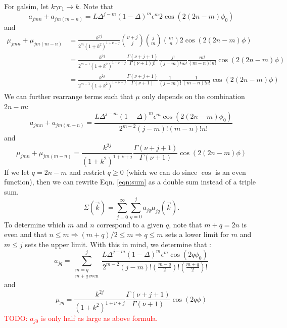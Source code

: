 \documentclass{article}
\newcommand{\red}[1]{\textcolor{red}{#1}}
\begin{document}
For galsim, let $k \gamma r_1 \rightarrow k$.
Note that
\begin{equation}
  a_{jmn} + a_{jm(m-n)} = L \Delta^{j-m}(1-\Delta)^m\epsilon^m2\cos(2 (2n-m) \phi_0)
\end{equation}
and
\begin{equation}
  \begin{split}
    \mu_{jmn} + \mu_{jm(m-n)} & = \frac{k^{2j}}{2^m(1+k^2)^{1+\nu+j}}\binom{\nu+j}{j}\binom{j}{m}\binom{m}{n}2 \cos(2 (2n-m) \phi) \\
    & = \frac{k^{2j}}{2^{m-1}(1+k^2)^{1+\nu+j}}
    \frac{\Gamma(\nu+j+1)}{\Gamma(\nu+1) j!}
    \frac{j!}{(j-m)!m!}
    \frac{m!}{(m-n)!n!}
    \cos(2 (2n-m) \phi) \\
    & = \frac{k^{2j}}{2^{m-1}(1+k^2)^{1+\nu+j}}
    \frac{\Gamma(\nu+j+1)}{\Gamma(\nu+1)}
    \frac{1}{(j-m)!}
    \frac{1}{(m-n)!n!}
    \cos(2 (2n-m) \phi)
  \end{split}
\end{equation}
We can further rearrange terms such that $\mu$ only depends on the combination $2n-m$:
\begin{equation}
  a_{jmn} + a_{jm(m-n)} = \frac{L \Delta^{j-m}(1-\Delta)^m\epsilon^m\cos(2 (2n-m) \phi_0)}
  {2^{m-2}(j-m)!(m-n)!n!}
\end{equation}
and
\begin{equation}
  \mu_{jmn} + \mu_{jm(m-n)} = \frac{k^{2j}}{(1+k^2)^{1+\nu+j}}
    \frac{\Gamma(\nu+j+1)}{\Gamma(\nu+1)}
    \cos(2 (2n-m) \phi)
\end{equation}
If we let $q=2n-m$ and restrict $q \ge 0$ (which we can do since $\cos$ is an even function), then we can rewrite Eqn. \ref{eqn:sum} as a double sum instead of a triple sum.
\begin{equation}
  \Sigma(\vec{k}) = \sum_{j=0}^{\infty}\sum_{q=0}^{j} a_{jq}\mu_{jq}(\vec{k}).
\end{equation}
To determine which $m$ and $n$ correspond to a given $q$, note that $m+q=2n$ is even and that $n \le m \Rightarrow (m+q)/2 \le m \Rightarrow q \le m$ sets a lower limit for $m$ and $m \le j$ sets the upper limit.
With this in mind, we determine that :
\begin{equation}
  a_{jq} = \sum_{\substack{m=q\\m+q\,\mathrm{even}}}^{j}\frac{L \Delta^{j-m}(1-\Delta)^m\epsilon^m\cos(2 q \phi_0)}
  {2^{m-2}(j-m)!(\frac{m-q}{2})!(\frac{m+q}{2})!}
\end{equation}
and
\begin{equation}
  \mu_{jq} = \frac{k^{2j}}{(1+k^2)^{1+\nu+j}}\frac{\Gamma(\nu+j+1)}{\Gamma(\nu+1)}\cos(2 q \phi)
\end{equation}
\red{TODO: $a_{j0}$ is only half as large as above formula.}
\end{document}
